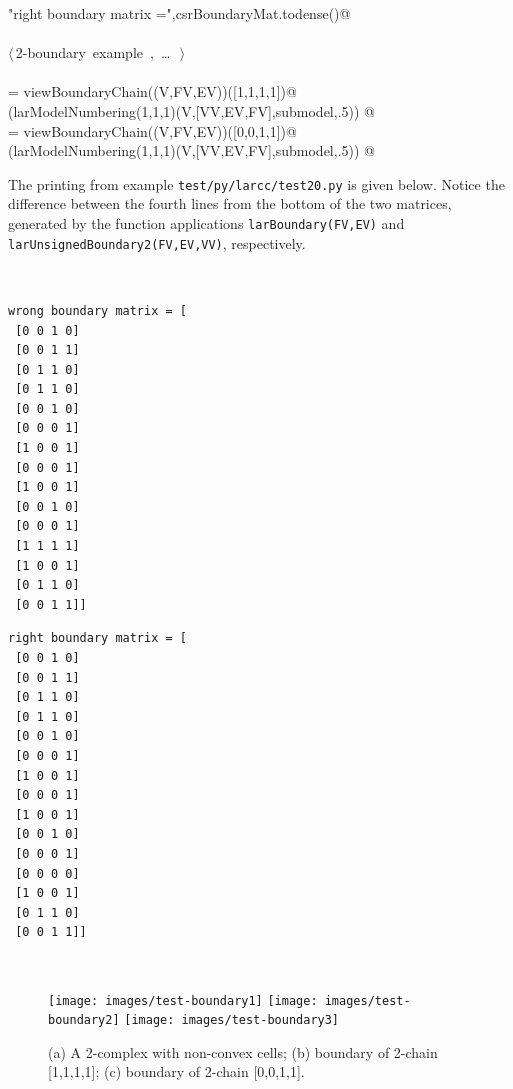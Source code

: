 \documentclass[11pt,oneside]{article}    %
\begin{document}
\begin{flushleft}
\begin{list}{}{}
\mbox{}\verb@print "right boundary matrix =",csrBoundaryMat.todense()@\\
\mbox{}\verb@@\\
\mbox{}\verb@@\hbox{$\langle\,$2-boundary example\nobreak\ {\footnotesize {}, \ldots\ }$\,\rangle$}\verb@@\\
\mbox{}\verb@@\\
\mbox{}\verb@submodel = viewBoundaryChain((V,FV,EV))([1,1,1,1])@\\
\mbox{}\verb@VIEW(larModelNumbering(1,1,1)(V,[VV,EV,FV],submodel,.5)) @\\
\mbox{}\verb@submodel = viewBoundaryChain((V,FV,EV))([0,0,1,1])@\\
\mbox{}\verb@VIEW(larModelNumbering(1,1,1)(V,[VV,EV,FV],submodel,.5)) @\\
\mbox{}\verb@@{\NWsep}
\end{list}
\vspace{-2ex}
\end{flushleft}

The printing from example \texttt{test/py/larcc/test20.py} is given below. Notice the difference between the fourth lines from the bottom of the two matrices, generated by the function applications \texttt{larBoundary(FV,EV)} and \texttt{larUnsignedBoundary2(FV,EV,VV)}, respectively.

\vspace{2mm}
~\hfill
\begin{minipage}[c]{0.35\textwidth}
\centering\footnotesize
\begin{verbatim}
wrong boundary matrix = [
 [0 0 1 0]
 [0 0 1 1]
 [0 1 1 0]
 [0 1 1 0]
 [0 0 1 0]
 [0 0 0 1]
 [1 0 0 1]
 [0 0 0 1]
 [1 0 0 1]
 [0 0 1 0]
 [0 0 0 1]
 [1 1 1 1]
 [1 0 0 1]
 [0 1 1 0]
 [0 0 1 1]]
\end{verbatim}
\end{minipage}
\hfill
\begin{minipage}[c]{0.35\textwidth}
\centering\footnotesize
\begin{verbatim}
right boundary matrix = [
 [0 0 1 0]
 [0 0 1 1]
 [0 1 1 0]
 [0 1 1 0]
 [0 0 1 0]
 [0 0 0 1]
 [1 0 0 1]
 [0 0 0 1]
 [1 0 0 1]
 [0 0 1 0]
 [0 0 0 1]
 [0 0 0 0]
 [1 0 0 1]
 [0 1 1 0]
 [0 0 1 1]]
\end{verbatim}
\end{minipage}
\hfill~


\begin{figure}[htbp] %
   \centering
   \texttt{[image: images/test-boundary1]} 
   \texttt{[image: images/test-boundary2]} 
   \texttt{[image: images/test-boundary3]} 
   \caption{(a) A 2-complex with non-convex cells; (b) boundary of 2-chain [1,1,1,1]; (c) boundary of 2-chain [0,0,1,1].}
   \label{fig:example}
\end{figure}
\end{document}
